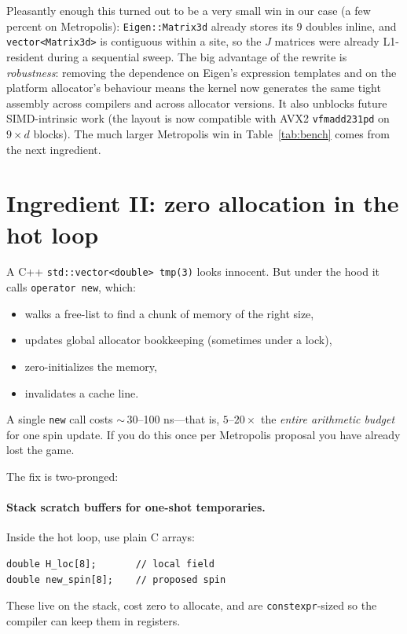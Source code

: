 \documentclass[11pt,letterpaper]{article}
\begin{document}
Pleasantly enough this turned out to be a very small win in our case
(a few percent on Metropolis): \texttt{Eigen::Matrix3d} already
stores its 9 doubles inline, and \texttt{vector<Matrix3d>} is
contiguous within a site, so the $J$ matrices were already L1-resident
during a sequential sweep.  The big advantage of the rewrite is
\emph{robustness}: removing the dependence on Eigen's expression
templates and on the platform allocator's behaviour means the
kernel now generates the same tight assembly across compilers and
across allocator versions.  It also unblocks future SIMD-intrinsic
work (the layout is now compatible with AVX2 \texttt{vfmadd231pd}
on $9 \times d$ blocks).  The much larger Metropolis win in
Table~\ref{tab:bench} comes from the next ingredient.

\section{Ingredient II: zero allocation in the hot loop}
\label{sec:zero-alloc}

A C++ \texttt{std::vector<double> tmp(3)} looks innocent.  But under the
hood it calls \texttt{operator new}, which:
\begin{itemize}[noitemsep]
  \item walks a free-list to find a chunk of memory of the right size,
  \item updates global allocator bookkeeping (sometimes under a lock),
  \item zero-initializes the memory,
  \item invalidates a cache line.
\end{itemize}
A single \texttt{new} call costs $\sim$\,30--100 ns---that is, $5$--$20\times$ the
\emph{entire arithmetic budget} for one spin update.  If you do this
once per Metropolis proposal you have already lost the game.

The fix is two-pronged:

\paragraph{Stack scratch buffers for one-shot temporaries.}  Inside the
hot loop, use plain C arrays:
\begin{lstlisting}
double H_loc[8];       // local field
double new_spin[8];    // proposed spin
\end{lstlisting}
These live on the stack, cost zero to allocate, and are
\texttt{constexpr}-sized so the compiler can keep them in registers.
\end{document}
